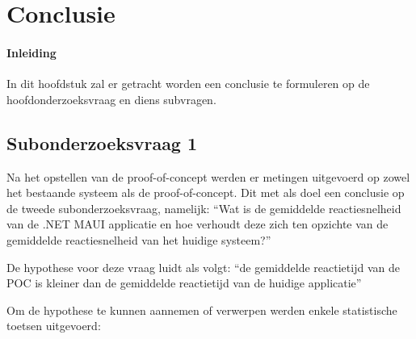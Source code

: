 
\chapter{Conclusie}%
\label{ch:conclusie}

\subsubsection{Inleiding}
In dit hoofdstuk zal er getracht worden een conclusie te formuleren op de hoofdonderzoeksvraag en diens subvragen.

\section{Subonderzoeksvraag 1}
Na het opstellen van de proof-of-concept werden er metingen uitgevoerd op zowel het bestaande systeem als de proof-of-concept. Dit met als doel een conclusie op de tweede subonderzoeksvraag, namelijk: ``Wat is de gemiddelde reactiesnelheid van de .NET MAUI applicatie en hoe verhoudt deze zich ten opzichte van de gemiddelde reactiesnelheid van het huidige systeem?''

De hypothese voor deze vraag luidt als volgt: ``de gemiddelde reactietijd van de POC is kleiner dan de gemiddelde reactietijd van de huidige applicatie''

Om de hypothese te kunnen aannemen of verwerpen werden enkele statistische toetsen uitgevoerd:

